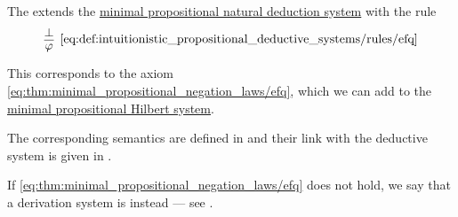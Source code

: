 \begin{definition}\label{def:intuitionistic_propositional_deductive_systems}
  The  extends the \hyperref[def:minimal_propositional_natural_deduction_system]{minimal propositional natural deduction system} with the rule
  \begin{equation*}\taglabel[\logic{EFQ}]{eq:def:intuitionistic_propositional_deductive_systems/rules/efq}
    \begin{prooftree}
      \hypo{ \bot }
      \infer1[\ref{eq:def:intuitionistic_propositional_deductive_systems/rules/efq}]{ \varphi }
    \end{prooftree}
  \end{equation*}
\end{definition}
\begin{comments}
  \item This corresponds to the axiom \eqref{eq:thm:minimal_propositional_negation_laws/efq}, which we can add to the \hyperref[def:minimal_propositional_hilbert_system]{minimal propositional Hilbert system}.
  \item The corresponding semantics are defined in  and their link with the deductive system is given in .
  \item If \eqref{eq:thm:minimal_propositional_negation_laws/efq} does not hold, we say that a derivation system is  instead --- see \cite{StanfordPlato:paraconsistent_logic}.
\end{comments}

